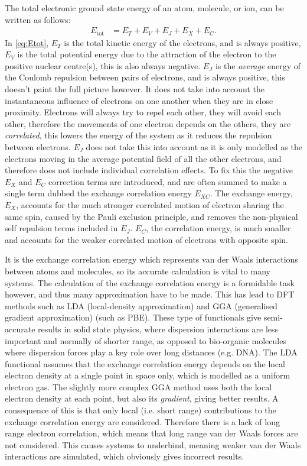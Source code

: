 \documentclass[10pt,a4paper,twocolumn,twoside]{extarticle}
\begin{document}
	The total electronic ground state energy of an atom, molecule, or ion, can be written as follows:
	\begin{align}\label{eq:Etot}
		E_\text{tot} &= E_T + E_V + E_J + E_X + E_C.
	\end{align}
	In \eqref{eq:Etot}, $E_T$ is the total kinetic energy of the electrons, and is always positive, $E_V$ is the total potential energy due to the attraction of the electron to the positive nuclear centre(s), this is also always negative. $E_J$ is the \emph{average} energy of the Coulomb repulsion between pairs of electrons, and is always positive, this doesn't paint the full picture however. 
	It does not take into account the instantaneous influence of electrons on one another when they are in close proximity. Electrons will always try to repel each other, they will avoid each other, therefore the movements of one electron depends on the others, they are \emph{correlated}, this lowers the energy of the system as it reduces the repulsion between electrons. $E_J$ does not take this into account as it is only modelled as the electrons moving in the average potential field of all the other electrons, and therefore does not include individual correlation effects. 
	To fix this the negative $E_X$ and $E_C$ correction terms are introduced, and are often summed to make a single term dubbed the exchange correlation energy $E_{XC}$. 
	The exchange energy, $E_X$, accounts for the much stronger correlated motion of electron sharing the same spin, caused by the Pauli exclusion principle, and removes the non-physical self repulsion terms included in $E_J$. $E_C$, the correlation energy, is much smaller and accounts for the weaker correlated motion of electrons with opposite spin. 

	It is the exchange correlation energy which represents van der Waals interactions between atoms and molecules, so its accurate calculation is vital to many systems.
	The calculation of the exchange correlation energy is a formidable task however, and thus many approximation have to be made. This has lead to DFT methods such as LDA (local-density approximation)\cite{LDA-Kohn1965} and GGA (generalised gradient approximation)\cite{GGA-Becke1988,GGA-Perdew1986} (such as PBE\cite{PBE}). 
	These type of functionals give semi-accurate results in solid state physics, where dispersion interactions are less important and normally of shorter range, as opposed to bio-organic molecules where dispersion forces play a key role over long distances (e.g. DNA).\cite{vdWImportance-Kaplan2006} The LDA functional assumes that the exchange correlation energy depends on the local electron density at a single point in space only, which is modelled as a uniform electron gas.\cite{LDA-Kohn1965} The slightly more complex GGA method uses both the local electron density at each point, but also its \emph{gradient}, giving better results.\cite{GGA-Becke1988,GGA-Perdew1986} A consequence of this is that only local (i.e. short range) contributions to the exchange correlation energy are considered. Therefore there is a lack of long range electron correlation, which means that long range van der Waals forces are not considered. This causes systems to underbind, meaning weaker van der Waals interactions are simulated, which obviously gives incorrect results. 
\end{document}
